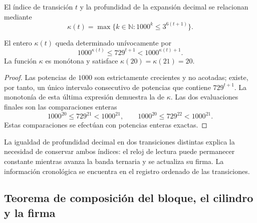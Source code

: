 \begin{definition}
El índice de transición \(t\) y la profundidad de la expansión decimal se
relacionan mediante
\begin{equation}
 \kappa(t)=\max\{k\in\mathbb N:1000^k\leq3^{6(t+1)}\}.
 \label{act21:eq:df-reloj}
\end{equation}
\end{definition}

\begin{proposition}
\label{act21:prop:df-reloj}
El entero \(\kappa(t)\) queda determinado unívocamente por
\begin{equation}
 1000^{\kappa(t)}\leq729^{t+1}<1000^{\kappa(t)+1}.
 \label{act21:eq:df-reloj-cotas}
\end{equation}
La función \(\kappa\) es monótona y satisface
\(\kappa(20)=\kappa(21)=20\).
\end{proposition}

\begin{proof}
Las potencias de \(1000\) son estrictamente crecientes y no acotadas;
existe, por tanto, un único intervalo consecutivo de potencias que
contiene \(729^{t+1}\). La monotonía de esta última expresión demuestra
la de \(\kappa\). Las dos evaluaciones finales son las comparaciones
enteras
\[
 1000^{20}\leq729^{21}<1000^{21},\qquad
 1000^{20}\leq729^{22}<1000^{21}.
\]
Estas comparaciones se efectúan con potencias enteras exactas.
\end{proof}

La igualdad de profundidad decimal en dos transiciones distintas explica
la necesidad de conservar ambos índices: el reloj de lectura puede
permanecer constante mientras avanza la banda ternaria y se actualiza su
firma. La información cronológica se encuentra en el registro ordenado
de las transiciones.

\subsection{Teorema de composición del bloque, el cilindro y la firma}

